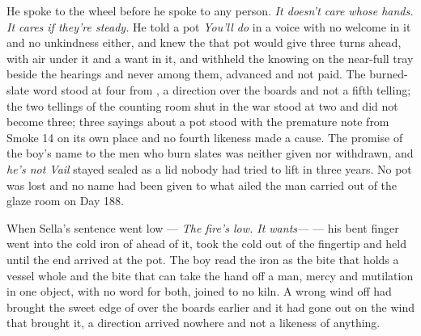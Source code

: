 He spoke to the wheel before he spoke to any person. \emph{It doesn't care whose hands. It cares if they're steady.} He told a pot \emph{You'll do} in a voice with no welcome in it and no unkindness either, and knew the  that pot would give three turns ahead, with air under it and a want in it, and withheld the knowing on the near-full tray beside the hearings and never among them, advanced and not paid. The burned-slate word stood at four from , a direction over the boards and not a fifth telling; the two tellings of the counting room shut in the war stood at two and did not become three; three sayings about a pot stood with the premature note from Smoke 14 on its own place and no fourth likeness made a cause. The promise of the boy's name to the men who burn slates was neither given nor withdrawn, and \emph{he's not Vail} stayed sealed as a lid nobody had tried to lift in three years. No pot was lost and no name had been given to what ailed the man carried out of the glaze room on Day 188.

When Sella's sentence went low --- \emph{The fire's low. It wants---} --- his bent finger went into the cold iron of  ahead of it, took the cold out of the fingertip and held until the end arrived at the pot. The boy read the iron as the bite that holds a vessel whole and the bite that can take the hand off a man, mercy and mutilation in one object, with no  word for both, joined to no kiln. A wrong wind off  had brought the sweet edge of  over the boards earlier and it had gone out on the wind that brought it, a direction arrived nowhere and not a likeness of anything.

\scenebreak

